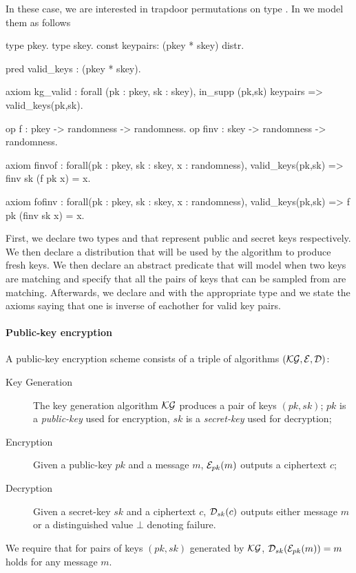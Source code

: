 In these case, we are interested in trapdoor permutations on type
. In \EC we model them as follows
\begin{easycrypt}[label={lst:owf}]{}
type pkey.
type skey.
const keypairs: (pkey * skey) distr.

pred valid_keys : (pkey * skey).

axiom kg_valid : forall (pk : pkey, sk : skey), 
in_supp (pk,sk) keypairs => valid_keys(pk,sk).

op f : pkey -> randomness -> randomness.
op finv : skey -> randomness -> randomness.


axiom finvof : forall(pk : pkey, sk : skey, x : randomness),
 valid_keys(pk,sk) => finv sk (f pk x) = x.

axiom fofinv : forall(pk : pkey, sk : skey, x : randomness),
 valid_keys(pk,sk) => f pk (finv sk x) = x.
\end{easycrypt}
First, we declare two types  and  that represent
public and secret keys respectively. We then declare a distribution
 that will be used by the \KG algorithm to produce fresh
keys. We then declare an abstract predicate that will model when two
keys are matching and specify that all the pairs of keys that can be
sampled from  are matching. Afterwards, we declare 
and  with the appropriate type and we state the axioms saying
that one is inverse of eachother for valid key pairs.
 
\paragraph{Public-key encryption}
A public-key encryption scheme consists of a triple of algorithms
$(\mathcal{KG},\mathcal{E},\mathcal{D})$:

\begin{description}
\item[Key Generation] 
  The key generation algorithm $\mathcal{KG}$ produces a pair of keys $(pk,sk)$;
  $pk$ is a \emph{public-key} used for encryption, $sk$ is
  a \emph{secret-key} used for decryption;

\item[Encryption] 
  Given a public-key $pk$ and a message $m$, $\mathcal{E}_{pk}(m)$ outputs a
  ciphertext $c$;

\item[Decryption] 
  Given a secret-key $sk$ and a ciphertext $c$, $\mathcal{D}_{sk}(c)$ outputs
  either message $m$ or a distinguished value $\bot$ denoting failure.
\end{description}
%
We require that for pairs of keys $(pk,sk)$ generated by $\mathcal{KG}$,
$\mathcal{D}_{sk}(\mathcal{E}_{pk}(m))= m$ holds for any message $m$. 

